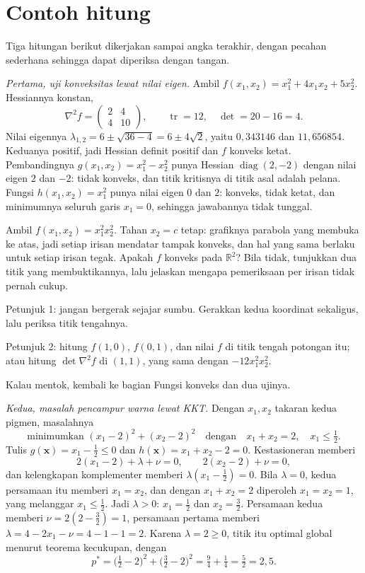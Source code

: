 \section{Contoh hitung}

Tiga hitungan berikut dikerjakan sampai angka terakhir, dengan pecahan sederhana sehingga
dapat diperiksa dengan tangan.

\emph{Pertama, uji konveksitas lewat nilai eigen.} Ambil
$f(x_{1},x_{2})=x_{1}^{2}+4x_{1}x_{2}+5x_{2}^{2}$. Hessiannya konstan,
\[
  \nabla^{2}f=\begin{pmatrix}2&4\\4&10\end{pmatrix},
  \qquad
  \operatorname{tr}=12,\quad \det=20-16=4 .
\]
Nilai eigennya $\lambda_{1,2}=6\pm\sqrt{36-4}=6\pm4\sqrt{2}$, yaitu
$0{,}343146$ dan $11{,}656854$. Keduanya positif, jadi Hessian definit positif dan $f$
konveks ketat. Pembandingnya $g(x_{1},x_{2})=x_{1}^{2}-x_{2}^{2}$ punya Hessian
$\operatorname{diag}(2,-2)$ dengan nilai eigen $2$ dan $-2$: tidak konveks, dan titik
kritisnya di titik asal adalah pelana. Fungsi $h(x_{1},x_{2})=x_{1}^{2}$ punya nilai
eigen $0$ dan $2$: konveks, tidak ketat, dan minimumnya seluruh garis $x_{1}=0$,
sehingga jawabannya tidak tunggal.

\begin{tantangan}
Ambil $f(x_{1},x_{2})=x_{1}^{2}x_{2}^{2}$. Tahan $x_{2}=c$ tetap: grafiknya parabola
yang membuka ke atas, jadi setiap irisan mendatar tampak konveks, dan hal yang sama
berlaku untuk setiap irisan tegak. Apakah $f$ konveks pada $\mathbb{R}^{2}$? Bila tidak,
tunjukkan dua titik yang membuktikannya, lalu jelaskan mengapa pemeriksaan per irisan
tidak pernah cukup.

Petunjuk 1: jangan bergerak sejajar sumbu. Gerakkan kedua koordinat sekaligus, lalu
periksa titik tengahnya.

Petunjuk 2: hitung $f(1,0)$, $f(0,1)$, dan nilai $f$ di titik tengah potongan itu; atau
hitung $\det\nabla^{2}f$ di $(1,1)$, yang sama dengan $-12x_{1}^{2}x_{2}^{2}$.

Kalau mentok, kembali ke bagian Fungsi konveks dan dua ujinya.
\end{tantangan}

\emph{Kedua, masalah pencampur warna lewat KKT.} Dengan $x_{1},x_{2}$ takaran kedua
pigmen, masalahnya
\[
  \text{minimumkan } (x_{1}-2)^{2}+(x_{2}-2)^{2}
  \quad\text{dengan}\quad x_{1}+x_{2}=2,\quad x_{1}\le\tfrac12 .
\]
Tulis $g(\mathbf{x})=x_{1}-\tfrac12\le0$ dan $h(\mathbf{x})=x_{1}+x_{2}-2=0$.
Kestasioneran memberi
\[
  2(x_{1}-2)+\lambda+\nu=0,\qquad 2(x_{2}-2)+\nu=0 ,
\]
dan kelengkapan komplementer memberi $\lambda(x_{1}-\tfrac12)=0$. Bila $\lambda=0$, kedua
persamaan itu memberi $x_{1}=x_{2}$, dan dengan $x_{1}+x_{2}=2$ diperoleh $x_{1}=x_{2}=1$,
yang melanggar $x_{1}\le\tfrac12$. Jadi $\lambda>0$: $x_{1}=\tfrac12$ dan $x_{2}=\tfrac32$.
Persamaan kedua memberi $\nu=2(2-\tfrac32)=1$, persamaan pertama memberi
$\lambda=4-2x_{1}-\nu=4-1-1=2$. Karena $\lambda=2\ge0$, titik itu optimal global menurut
teorema kecukupan, dengan
\[
  p^{*}=\bigl(\tfrac12-2\bigr)^{2}+\bigl(\tfrac32-2\bigr)^{2}
  =\tfrac94+\tfrac14=\tfrac52=2{,}5 .
\]

